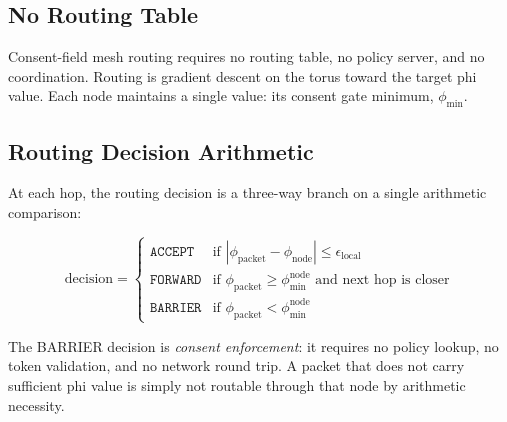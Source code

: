 \documentclass[11pt,a4paper]{article}
\begin{document}
\subsection{No Routing Table}

Consent-field mesh routing requires no routing table, no policy server, and no coordination. Routing is gradient descent on the torus toward the target phi value. Each node maintains a single value: its consent gate minimum, $\phi_{\min}$.

\subsection{Routing Decision Arithmetic}

At each hop, the routing decision is a three-way branch on a single arithmetic comparison:

\begin{equation}
\text{decision} =
\begin{cases}
\texttt{ACCEPT}  & \text{if } |\phi_{\text{packet}} - \phi_{\text{node}}| \leq \epsilon_{\text{local}} \\
\texttt{FORWARD} & \text{if } \phi_{\text{packet}} \geq \phi_{\min}^{\text{node}} \text{ and next hop is closer} \\
\texttt{BARRIER} & \text{if } \phi_{\text{packet}} < \phi_{\min}^{\text{node}}
\end{cases}
\label{eq:routing}
\end{equation}

The BARRIER decision is \emph{consent enforcement}: it requires no policy lookup, no token validation, and no network round trip. A packet that does not carry sufficient phi value is simply not routable through that node by arithmetic necessity.
\end{document}
